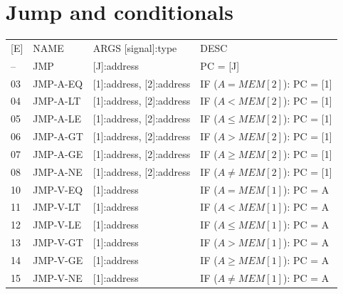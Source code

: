 \documentclass{scrreprt}
\begin{document}
	\section{Jump and conditionals}
	\begin{tabular}{l | l | l  l}
		[E] & NAME & ARGS [signal]:type & DESC \\
		-- & JMP & [J]:address & PC = [J]\\
		03 & JMP-A-EQ & [1]:address, [2]:address & IF ($A = MEM[2]$): PC = [1]\\
		04 & JMP-A-LT & [1]:address, [2]:address & IF ($A < MEM[2]$): PC = [1]\\
		05 & JMP-A-LE & [1]:address, [2]:address & IF ($A \le MEM[2]$): PC = [1]\\
		06 & JMP-A-GT & [1]:address, [2]:address & IF ($A > MEM[2]$): PC = [1]\\
		07 & JMP-A-GE & [1]:address, [2]:address & IF ($A \ge MEM[2]$): PC = [1]\\
		08 & JMP-A-NE & [1]:address, [2]:address & IF ($A \ne MEM[2]$): PC = [1]\\
		10 & JMP-V-EQ & [1]:address & IF ($A = MEM[1]$): PC = A\\
		11 & JMP-V-LT & [1]:address & IF ($A < MEM[1]$): PC = A\\
		12 & JMP-V-LE & [1]:address & IF ($A \le MEM[1]$): PC = A\\
		13 & JMP-V-GT & [1]:address & IF ($A > MEM[1]$): PC = A\\
		14 & JMP-V-GE & [1]:address & IF ($A \ge MEM[1]$): PC = A\\
		15 & JMP-V-NE & [1]:address & IF ($A \ne MEM[1]$): PC = A\\
	\end{tabular}
	
\end{document}
